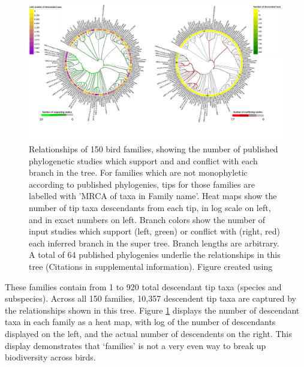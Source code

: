 \documentclass[oupdraft]{sysbio_sse}
\begin{document}
\begin{figure}[!p]
\centering\includegraphics[width=\textwidth]{bird_fam_fig}

\caption{Relationships of 150 bird families, showing the number of published phylogenetic studies which support and and conflict with each branch in the tree. For families which are not monophyletic according to published phylogenies, tips for those families are labelled with 'MRCA of taxa in Family name'. Heat maps show the number of tip taxa descendants from each tip, in log scale on left, and in exact numbers on left. Branch colors show the number of input studies which support (left, green) or conflict with (right, red) each inferred branch in the super tree. Branch lengths are arbitrary. A total of 64 published phylogenies underlie the relationships in this tree (Citations in supplemental information). Figure created using \citep{letunic_interactive_2019}}
\label{birdfams}
\end{figure}

These families contain from 1 to 920 total descendant tip taxa (species and subspecies).
Across all 150 families, 10,357 descendent tip taxa  are captured by the relationships shown in this tree.
Figure \ref{birdfams} displays the number of descendant taxa in each family as a heat map, with log of the number of descendants displayed on the left, and the actual number of descendents on the right.
This display demonstrates that `families' is not a very even way to break up biodiversity across birds.
\end{document}
